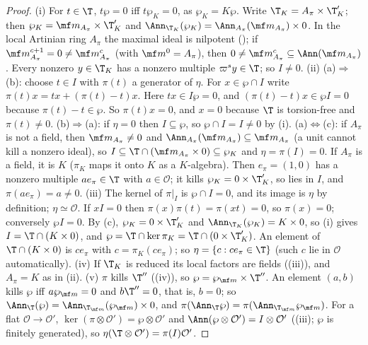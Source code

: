 \begin{proof}
(i) For $t\in\T$, $t\wp=0$ iff $t\wp_K=0$, as $\wp_K=K\wp$. Write $\T_K=A_\pi\times\T'_K$; then $\wp_K=\mf m_{A_\pi}\times\T'_K$ and
$\Ann_{\T_K}(\wp_K)=\Ann_{A_\pi}(\mf m_{A_\pi})\times0$. In the local Artinian ring $A_\pi$ the maximal ideal is nilpotent (); if
$\mf m_{A_\pi}^{c+1}=0\ne\mf m_{A_\pi}^c$ (with $\mf m^0=A_\pi$), then $0\ne\mf m_{A_\pi}^c\subseteq\Ann(\mf m_{A_\pi})$. Every nonzero $y\in\T_K$ has a nonzero multiple $\varpi^sy\in\T$; so
$I\ne0$.
(ii) (a)$\Rightarrow$(b): choose $t\in I$ with $\pi(t)$ a generator of $\eta$. For $x\in\wp\cap I$ write $\pi(t)x=tx+(\pi(t)-t)x$. Here $tx\in I\wp=0$, and $(\pi(t)-t)x\in\wp I=0$
because $\pi(t)-t\in\wp$. So $\pi(t)x=0$, and $x=0$ because $\T$ is torsion-free and $\pi(t)\ne0$.
(b)$\Rightarrow$(a): if $\eta=0$ then $I\subseteq\wp$, so $\wp\cap I=I\ne0$ by (i).
(a)$\Leftrightarrow$(c): if $A_\pi$ is not a field, then $\mf m_{A_\pi}\ne0$ and $\Ann_{A_\pi}(\mf m_{A_\pi})\subseteq\mf m_{A_\pi}$ (a unit cannot kill a nonzero ideal), so
$I\subseteq\T\cap(\mf m_{A_\pi}\times0)\subseteq\wp_K$ and $\eta=\pi(I)=0$. If $A_\pi$ is a field, it is $K$ ($\pi_K$ maps it onto $K$ as a $K$-algebra). Then $e_\pi=(1,0)$ has a
nonzero multiple $ae_\pi\in\T$ with $a\in\mathcal O$; it kills $\wp_K=0\times\T'_K$, so lies in $I$, and $\pi(ae_\pi)=a\ne0$.
(iii) The kernel of $\pi|_I$ is $\wp\cap I=0$, and its image is $\eta$ by definition; $\eta\simeq\mathcal O$. If $xI=0$ then $\pi(x)\pi(t)=\pi(xt)=0$, so $\pi(x)=0$; conversely
$\wp I=0$. By (c), $\wp_K=0\times\T'_K$ and $\Ann_{\T_K}(\wp_K)=K\times0$, so (i) gives $I=\T\cap(K\times0)$, and $\wp=\T\cap\ker\pi_K=\T\cap(0\times\T'_K)$. An element of
$\T\cap(K\times0)$ is $ce_\pi$ with $c=\pi_K(ce_\pi)$; so $\eta=\{c:ce_\pi\in\T\}$ (such $c$ lie in $\mathcal O$ automatically).
(iv) If $\T_K$ is reduced its local factors are fields ((iii)), and $A_\pi=K$ as in (ii).
(v) $\pi$ kills $\T''$ ((iv)), so $\wp=\wp_{\mf m}\times\T''$. An element $(a,b)$ kills $\wp$ iff $a\wp_{\mf m}=0$ and $b\T''=0$, that is, $b=0$; so
$\Ann_\T(\wp)=\Ann_{\T_{\mf m}}(\wp_{\mf m})\times0$, and $\pi(\Ann_\T\wp)=\pi(\Ann_{\T_{\mf m}}\wp_{\mf m})$. For a flat $\mathcal O\to\mathcal O'$, $\ker(\pi\otimes\mathcal O')=\wp\otimes\mathcal O'$ and
$\Ann(\wp\otimes\mathcal O')=I\otimes\mathcal O'$ ((iii); $\wp$ is finitely generated), so $\eta(\T\otimes\mathcal O')=\pi(I)\mathcal O'$.
\end{proof}

